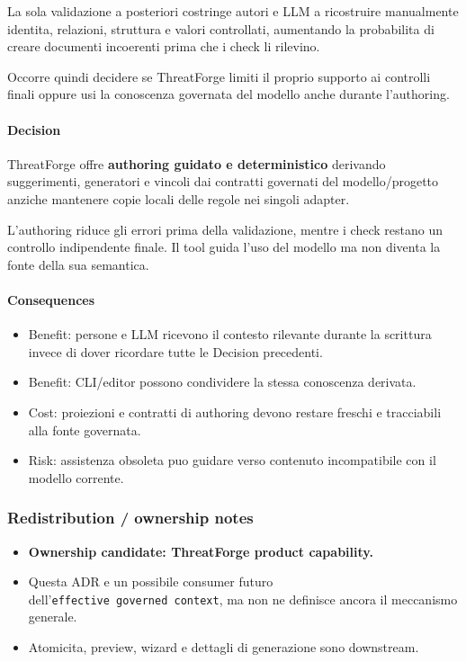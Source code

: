 \documentclass[
  10pt,
]{article}
\providecommand{\tightlist}{%
  \setlength{\itemsep}{0pt}\setlength{\parskip}{0pt}}
\begin{document}
La sola validazione a posteriori costringe autori e LLM a ricostruire
manualmente identita, relazioni, struttura e valori controllati,
aumentando la probabilita di creare documenti incoerenti prima che i
check li rilevino.

Occorre quindi decidere se ThreatForge limiti il proprio supporto ai
controlli finali oppure usi la conoscenza governata del modello anche
durante l'authoring.

\paragraph{Decision}\label{decision-25}

ThreatForge offre \textbf{authoring guidato e deterministico} derivando
suggerimenti, generatori e vincoli dai contratti governati del
modello/progetto anziche mantenere copie locali delle regole nei singoli
adapter.

L'authoring riduce gli errori prima della validazione, mentre i check
restano un controllo indipendente finale. Il tool guida l'uso del
modello ma non diventa la fonte della sua semantica.

\paragraph{Consequences}\label{consequences-25}

\begin{itemize}
\tightlist
\item
  Benefit: persone e LLM ricevono il contesto rilevante durante la
  scrittura invece di dover ricordare tutte le Decision precedenti.
\item
  Benefit: CLI/editor possono condividere la stessa conoscenza derivata.
\item
  Cost: proiezioni e contratti di authoring devono restare freschi e
  tracciabili alla fonte governata.
\item
  Risk: assistenza obsoleta puo guidare verso contenuto incompatibile
  con il modello corrente.
\end{itemize}

\subsubsection{Redistribution / ownership
notes}\label{redistribution-ownership-notes-12}

\begin{itemize}
\tightlist
\item
  \textbf{Ownership candidate: ThreatForge product capability.}
\item
  Questa ADR e un possibile consumer futuro
  dell'\texttt{effective\ governed\ context}, ma non ne definisce ancora
  il meccanismo generale.
\item
  Atomicita, preview, wizard e dettagli di generazione sono downstream.
\end{itemize}
\end{document}
